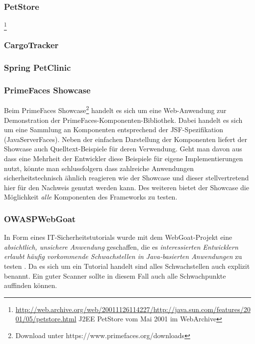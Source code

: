 \subsubsection{PetStore}

\footnote{\url{http://web.archive.org/web/20011126114227/http://java.sun.com/features/2001/05/petstore.html} J2EE PetStore vom Mai 2001 im WebArchive}

\subsubsection{CargoTracker}

\subsubsection{Spring PetClinic}

\subsubsection{PrimeFaces Showcase}

Beim PrimeFaces Showcase\footnote{Download unter https://www.primefaces.org/downloads} handelt es sich um eine Web-Anwendung zur Demonstration der PrimeFaces-Komponenten-Bibliothek. Dabei handelt es sich um eine Sammlung an Komponenten entsprechend der JSF-Spezifikation (JavaServerFaces). Neben der einfachen Darstellung der Komponenten liefert der Showcase auch Quelltext-Beispiele für deren Verwendung. Geht man davon aus dass eine Mehrheit der Entwickler diese Beispiele für eigene Implementierungen nutzt, könnte man schlussfolgern dass zahlreiche Anwendungen sicherheitstechnisch ähnlich reagieren wie der Showcase und dieser stellvertretend hier für den Nachweis genutzt werden kann. Des weiteren bietet der Showcase die Möglichkeit \emph{alle} Komponenten des Frameworks zu testen.


\subsubsection{OWASP\textregistered WebGoat}

In Form eines IT-Sicherheitstutorials wurde mit dem WebGoat-Projekt eine \emph{absichtlich, unsichere Anwendung} geschaffen, die es \emph{interessierten Entwicklern erlaubt häufig vorkommende Schwachstellen in Java-basierten Anwendungen} zu testen \cite{owaspgoat}. Da es sich um ein Tutorial handelt sind alles Schwachstellen auch explizit benannt. Ein guter Scanner sollte in diesem Fall auch alle Schwachpunkte auffinden können. 


